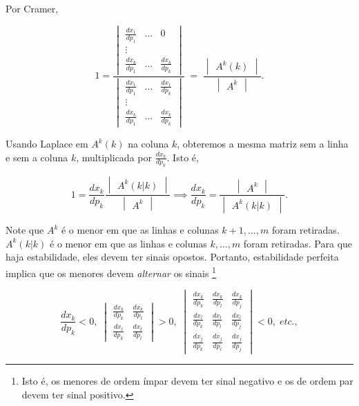 \documentclass[
	12pt,				%
	openright,			%
	twoside,			%
	a4paper,			%
	english,			%
	french,				%
	spanish,			%
	brazil				%
	]{abntex2}
\begin{document}
Por Cramer,

\begin{equation} \label{cramerperf}
	1 =
	\frac{\begin{vmatrix}
		\frac{dx_1}{dp_1} & \ldots & 0  \\
		\vdots \\
		\frac{dx_k}{dp_1} & \ldots & \frac{dx_k}{dp_k}
	\end{vmatrix}}
	{\begin{vmatrix}
		\frac{dx_1}{dp_1} & \ldots & \frac{dx_1}{dp_k} \\
		\vdots \\
		\frac{dx_k}{dp_1} & \ldots & \frac{dx_k}{dp_k}
	\end{vmatrix}} \; = \;
   \frac{
	\begin{vmatrix}
		A^k(k)
	\end{vmatrix}}
	{\begin{vmatrix}
		A^k
	\end{vmatrix}}.
\end{equation}

Usando Laplace em $A^k(k)$ na coluna $k$, obteremos a mesma matriz sem a linha e
sem a coluna $k$, multiplicada por $\frac{dx_k}{dp_k}$. Isto é,

\begin{equation} \label{laplaceperf}
	1 =
	\frac{dx_k}{dp_k}
	\frac{\begin{vmatrix}
		A^k(k|k)
	\end{vmatrix}}
	{\begin{vmatrix}
		A^k
	\end{vmatrix}}
	\implies
	\frac{dx_k}{dp_k} =
	\frac{\begin{vmatrix}
		A^k
	\end{vmatrix}}
	{\begin{vmatrix}
		A^k(k|k)
	\end{vmatrix}}.
\end{equation}

Note que $A^k$ é o menor em que as linhas e colunas $k+1, \ldots, m$ foram retiradas.
$A^k(k|k)$ é o menor em que as linhas e colunas $k, \ldots, m$ foram retiradas.
Para que haja estabilidade, eles devem ter sinais opostos.
Portanto, estabilidade perfeita implica que os menores devem \textit{alternar}
os sinais \footnote{Isto é, os menores de ordem
ímpar devem ter sinal negativo e os de ordem par devem ter sinal positivo.}

\begin{equation} \label{hicksaltern}
	\frac{dx_k}{dp_k} < 0, \;
	\begin{vmatrix}
	 		\frac{dx_k}{dp_k} & \frac{dx_k}{dp_l} \\
			\frac{dx_l}{dp_k} & \frac{dx_l}{dp_l}
	 \end{vmatrix} > 0, \;
	 \begin{vmatrix}
			 \frac{dx_k}{dp_k} & \frac{dx_k}{dp_l} & \frac{dx_k}{dp_j} \\
			 \frac{dx_l}{dp_k} & \frac{dx_l}{dp_l} & \frac{dx_l}{dp_j} \\
			 \frac{dx_j}{dp_k} & \frac{dx_j}{dp_l} & \frac{dx_j}{dp_j}
	 \end{vmatrix} < 0, \; etc.,
\end{equation}
\end{document}

